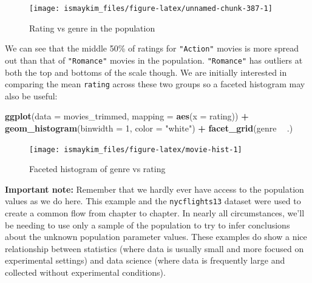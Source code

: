 \documentclass[12pt,]{krantz}
\makeatletter
\newenvironment{Shaded}{\begin{snugshade}}{\end{snugshade}}
\newcommand{\KeywordTok}[1]{\textcolor[rgb]{0.27,0.27,0.27}{\textbf{#1}}}
\newcommand{\DataTypeTok}[1]{\textcolor[rgb]{0.27,0.27,0.27}{#1}}
\newcommand{\DecValTok}[1]{\textcolor[rgb]{0.06,0.06,0.06}{#1}}
\newcommand{\StringTok}[1]{\textcolor[rgb]{0.5,0.5,0.5}{#1}}
\newcommand{\OperatorTok}[1]{\textcolor[rgb]{0.43,0.43,0.43}{\textbf{#1}}}
\newcommand{\NormalTok}[1]{#1}
\newenvironment{kframe}{%
\medskip{}
\setlength{\fboxsep}{.8em}
 \def\at@end@of@kframe{}%
 \ifinner\ifhmode%
  \def\at@end@of@kframe{\end{minipage}}%
  \begin{minipage}{\columnwidth}%
 \fi\fi%
 \def\FrameCommand##1{\hskip\@totalleftmargin \hskip-\fboxsep
 \colorbox{shadecolor}{##1}\hskip-\fboxsep
     \hskip-\linewidth \hskip-\@totalleftmargin \hskip\columnwidth}%
 \MakeFramed {\advance\hsize-\width
   \@totalleftmargin\z@ \linewidth\hsize
   \@setminipage}}%
 {\par\unskip\endMakeFramed%
 \at@end@of@kframe}
\renewenvironment{Shaded}{\begin{kframe}}{\end{kframe}}
\makeatother
\begin{document}
\begin{figure}

{\centering \texttt{[image: ismaykim\_files/figure-latex/unnamed-chunk-387-1]} 

}

\caption{Rating vs genre in the population}\label{fig:unnamed-chunk-387}
\end{figure}

We can see that the middle 50\% of ratings for \texttt{"Action"} movies
is more spread out than that of \texttt{"Romance"} movies in the
population. \texttt{"Romance"} has outliers at both the top and bottoms
of the scale though. We are initially interested in comparing the mean
\texttt{rating} across these two groups so a faceted histogram may also
be useful:

\begin{Shaded}
\begin{Highlighting}[]
\KeywordTok{ggplot}\NormalTok{(}\DataTypeTok{data =}\NormalTok{ movies_trimmed, }\DataTypeTok{mapping =} \KeywordTok{aes}\NormalTok{(}\DataTypeTok{x =}\NormalTok{ rating)) }\OperatorTok{+}
\StringTok{  }\KeywordTok{geom_histogram}\NormalTok{(}\DataTypeTok{binwidth =} \DecValTok{1}\NormalTok{, }\DataTypeTok{color =} \StringTok{"white"}\NormalTok{) }\OperatorTok{+}
\StringTok{  }\KeywordTok{facet_grid}\NormalTok{(genre }\OperatorTok{~}\StringTok{ }\NormalTok{.)}
\end{Highlighting}
\end{Shaded}

\begin{figure}

{\centering \texttt{[image: ismaykim\_files/figure-latex/movie-hist-1]} 

}

\caption{Faceted histogram of genre vs rating}\label{fig:movie-hist}
\end{figure}

\textbf{Important note:} Remember that we hardly ever have access to the
population values as we do here. This example and the
\texttt{nycflights13} dataset were used to create a common flow from
chapter to chapter. In nearly all circumstances, we'll be needing to use
only a sample of the population to try to infer conclusions about the
unknown population parameter values. These examples do show a nice
relationship between statistics (where data is usually small and more
focused on experimental settings) and data science (where data is
frequently large and collected without experimental conditions).
\end{document}
